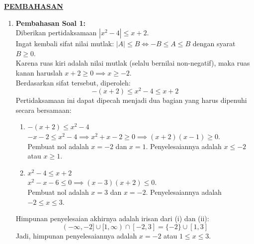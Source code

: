 \documentclass[11pt,openany,a4paper]{article}
\begin{document}


\newpage
{}

\begin{center}
  {\underline{\textbf{\MakeUppercase{Pembahasan}}}}
\end{center}

\begin{enumerate}
  \item \textbf{Pembahasan Soal 1:} \\
        Diberikan pertidaksamaan $|x^2 - 4| \le x + 2$. \\
        Ingat kembali sifat nilai mutlak: $|A| \le B \iff -B \le A \le B$ dengan syarat $B \ge 0$. \\
        Karena ruas kiri adalah nilai mutlak (selalu bernilai non-negatif), maka ruas kanan haruslah $x + 2 \ge 0 \implies x \ge -2$. \\
        Berdasarkan sifat tersebut, diperoleh:
        \[
          -(x + 2) \le x^2 - 4 \le x + 2
        \]
        Pertidaksamaan ini dapat dipecah menjadi dua bagian yang harus dipenuhi secara bersamaan:
        \begin{enumerate}[label=(\roman*)]
          \item $-(x + 2) \le x^2 - 4$ \\
                $-x - 2 \le x^2 - 4 \implies x^2 + x - 2 \ge 0 \implies (x+2)(x-1) \ge 0$. \\
                Pembuat nol adalah $x = -2$ dan $x = 1$. Penyelesaiannya adalah $x \le -2$ atau $x \ge 1$.
          \item $x^2 - 4 \le x + 2$ \\
                $x^2 - x - 6 \le 0 \implies (x-3)(x+2) \le 0$. \\
                Pembuat nol adalah $x = 3$ dan $x = -2$. Penyelesaiannya adalah $-2 \le x \le 3$.
        \end{enumerate}
        Himpunan penyelesaian akhirnya adalah irisan dari (i) dan (ii):
        \[
          (-\infty, -2] \cup [1, \infty)  \cap  [-2, 3] = \{-2\} \cup [1, 3]
        \]
        Jadi, himpunan penyelesaiannya adalah $x = -2$ atau $1 \le x \le 3$.


\end{enumerate}
\end{document}
